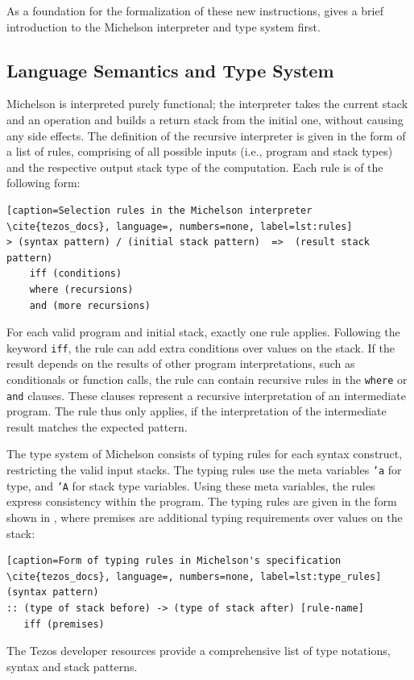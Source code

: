 As a foundation for the formalization of these new instructions,  gives a brief introduction to the Michelson interpreter and type system first.  

\subsection{Language Semantics and Type System}\label{sec:michelson_semantics}
Michelson is interpreted purely functional; the interpreter takes the current stack and an operation and builds a return stack from the initial one, without causing any side effects. The definition of the recursive interpreter is given in the form of a list of rules, comprising of all possible inputs (i.e., program and stack types) and the respective output stack type of the computation. Each rule is of the following form: 
\begin{lstlisting}[caption=Selection rules in the Michelson interpreter \cite{tezos_docs}, language=, numbers=none, label=lst:rules]
> (syntax pattern) / (initial stack pattern)  =>  (result stack pattern)
    iff (conditions)
    where (recursions)
    and (more recursions)
\end{lstlisting}
For each valid program and initial stack, exactly one rule applies. Following the keyword \texttt{iff}, the rule can add extra conditions over values on the stack. If the result depends on the results of other program interpretations, such as conditionals or function calls, the rule can contain recursive rules in the \texttt{where} or \texttt{and} clauses. These clauses represent a recursive interpretation of an intermediate program. The rule thus only applies, if the interpretation of the intermediate result matches the expected pattern.

The type system of Michelson consists of typing rules for each syntax construct, restricting the valid input stacks. The typing rules use the meta variables \texttt{'a} for type, and \texttt{'A} for stack type variables. Using these meta variables, the rules express consistency within the program. The typing rules are given in the form shown in , where premises are additional typing requirements over values on the stack:
\begin{lstlisting}[caption=Form of typing rules in Michelson's specification \cite{tezos_docs}, language=, numbers=none, label=lst:type_rules]
(syntax pattern)
:: (type of stack before) -> (type of stack after) [rule-name]
   iff (premises)
\end{lstlisting}
The Tezos developer resources \cite{tezos_docs} provide a comprehensive list of type notations, syntax and stack patterns.

